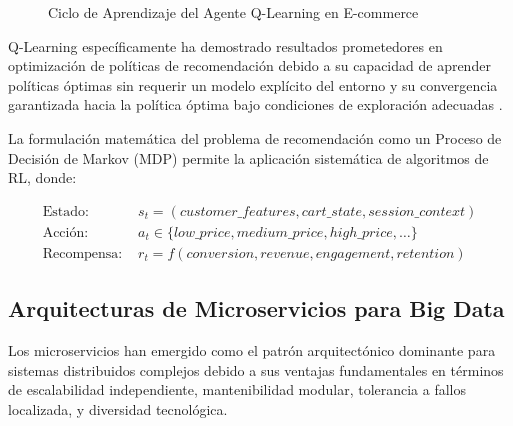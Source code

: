 \documentclass[conference,10pt,letterpaper]{IEEEtran}
\begin{document}
\begin{figure}[H]
\caption{Ciclo de Aprendizaje del Agente Q-Learning en E-commerce}
\label{fig:rl_cycle}
\end{figure}

\vspace{0.2cm}

Q-Learning específicamente ha demostrado resultados prometedores en optimización de políticas de recomendación debido a su capacidad de aprender políticas óptimas sin requerir un modelo explícito del entorno y su convergencia garantizada hacia la política óptima bajo condiciones de exploración adecuadas \cite{watkins1992q}.

La formulación matemática del problema de recomendación como un Proceso de Decisión de Markov (MDP) permite la aplicación sistemática de algoritmos de RL, donde:

\begin{align}
\text{Estado: } & s_t = (customer\_features, cart\_state, session\_context) \\
\text{Acción: } & a_t \in \{low\_price, medium\_price, high\_price, \ldots\} \\
\text{Recompensa: } & r_t = f(conversion, revenue, engagement, retention)
\end{align}

\subsection{Arquitecturas de Microservicios para Big Data}
\label{subsec:microservices}

Los microservicios han emergido como el patrón arquitectónico dominante para sistemas distribuidos complejos debido a sus ventajas fundamentales en términos de escalabilidad independiente, mantenibilidad modular, tolerancia a fallos localizada, y diversidad tecnológica.

\vspace{0.3cm}
\end{document}
